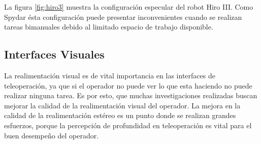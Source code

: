   La figura \ref{fig:hiro3} muestra la configuración especular del robot Hiro III. Como Spydar ésta configuración puede presentar inconvenientes cuando se realizan tareas bimanuales debido al limitado espacio de trabajo disponible. 



\subsection{Interfaces Visuales}

La realimentación visual es de vital importancia en las interfaces de teleoperación, ya que si el operador no puede ver lo que esta haciendo no puede realizar ninguna tarea. Es por esto, que muchas investigaciones realizadas buscan mejorar la calidad de la realimentación visual del operador. La mejora en la calidad de la realimentación estéreo es un punto donde se realizan grandes esfuerzos, porque la percepción de profundidad en teleoperación es vital para el buen desempeño del operador. 

